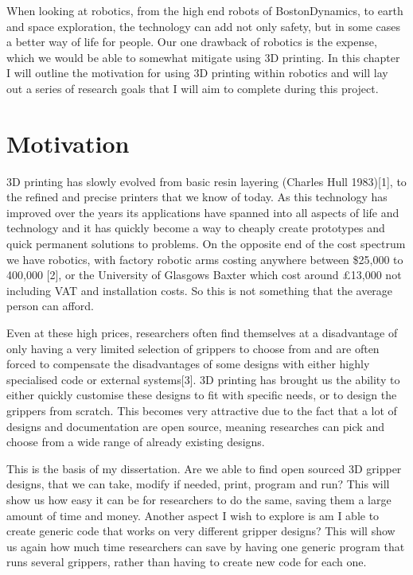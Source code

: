 \documentclass{l4proj}
\begin{document}
When looking at robotics, from the high end robots of BostonDynamics, to earth and space exploration, the technology can add not only safety, but in some cases a better way of life for people. Our one drawback of robotics is the expense, which we would be able to somewhat mitigate using 3D printing. In this chapter I will outline the motivation for using 3D printing within robotics and will lay out a series of research goals that I will aim to complete during this project. 


\section{Motivation}
3D printing has slowly evolved from basic resin layering (Charles Hull 1983)[1], to the refined and precise printers that we know of today. As this technology has improved over the years its applications have spanned into all aspects of life and technology and it has quickly become a way to cheaply create prototypes and quick permanent solutions to problems. On the opposite end of the cost spectrum we have robotics, with factory robotic arms costing anywhere between \$25,000 to 400,000 [2], or the University of Glasgows Baxter which cost around £13,000 not including VAT and installation costs. So this is not something that the average person can afford.

Even at these high prices, researchers often find themselves at a disadvantage of only having a very limited selection of grippers to choose from and are often forced to compensate the disadvantages of some designs with either highly specialised code or external systems[3]. 3D printing has brought us the ability to either quickly customise these designs to fit with specific needs, or to design the grippers from scratch. This becomes very attractive due to the fact that a lot of designs and documentation are open source, meaning researches can pick and choose from a wide range of already existing designs.  

This is the basis of my dissertation. Are we able to find open sourced 3D gripper designs, that we can take, modify if needed, print, program and run? This will show us how easy it can be for researchers to do the same, saving them a large amount of time and money. Another aspect I wish to explore is am I able to create generic code that works on very different gripper designs? This will show us again how much time researchers can save by having one generic program that runs several grippers, rather than having to create new code for each one. 
\end{document}
